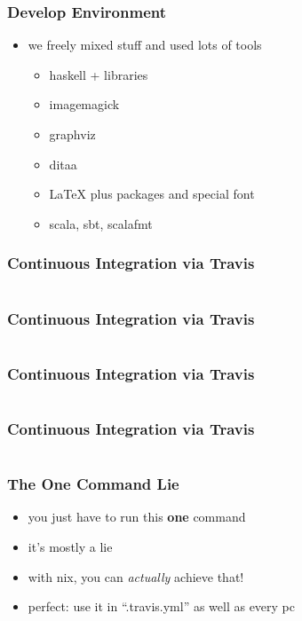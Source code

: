 \documentclass{beamer}
\begin{document}
\begin{frame}
  \frametitle{Develop Environment}
  \begin{itemize}
  \item we freely mixed stuff and used lots of tools
    \begin{itemize}
    \item haskell + libraries
    \item imagemagick
    \item graphviz
    \item ditaa
    \item LaTeX plus packages and special font
    \item scala, sbt, scalafmt
    \end{itemize}
  \end{itemize}
\end{frame}

\begin{frame}
  \frametitle{Continuous Integration via Travis}
  \inputminted[linenos=false, fontsize=\tiny, lastline=31]{yaml}{static-source/long-travis-ci.yml}
\end{frame}

\begin{frame}
  \frametitle{Continuous Integration via Travis}
  \inputminted[linenos=false, fontsize=\tiny, firstline=31, lastline=60]{yaml}{static-source/long-travis-ci.yml}
\end{frame}

\begin{frame}
  \frametitle{Continuous Integration via Travis}
  \inputminted[linenos=false, fontsize=\tiny, firstline=61, lastline=90]{yaml}{static-source/long-travis-ci.yml}
\end{frame}

\begin{frame}
  \frametitle{Continuous Integration via Travis}
  \inputminted[linenos=false, fontsize=\tiny, firstline=91, lastline=120]{yaml}{static-source/long-travis-ci.yml}
\end{frame}

\begin{frame}
  \frametitle{The One Command Lie}
  \begin{itemize}
  \item you just have to run this \textbf{one} command
  \item it's mostly a lie
  \item with nix, you can \textit{actually} achieve that!
  \item perfect: use it in ``.travis.yml'' as well as every pc
  \end{itemize}
\end{frame}
\end{document}
